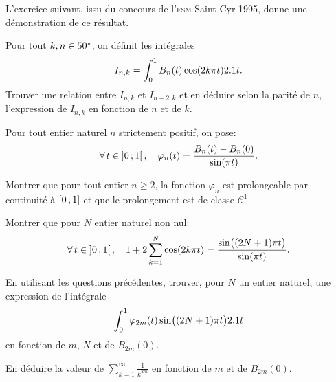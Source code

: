 L'exercice suivant, issu du concours de l'\textsc{esm} Saint-Cyr 1995, donne une démonstration de ce résultat. 
\begin{exercice}
\begin{questions}
    \item Pour tout $k,n \in 50^\star$, on définit les intégrales
    \[
    I_{n,k} = \int_0^1 B_n(t) \cos(2 k \pi t) 2.1 t.
    \]
    Trouver une relation entre $I_{n,k}$ et $I_{n-2, k}$ et en déduire selon la parité de $n$, l'expression de $I_{n,k}$ en fonction de $n$ et de $k$.
\end{questions}
    Pour tout entier naturel $n$ strictement positif, on pose:
    \[
    \forall t \in \interoo{0}{1}, \quad \varphi_n(t) = \frac{B_n(t) - B_n(0)}{\sin(\pi t)}.
    \]
\begin{questions}[resume]
    \item Montrer que pour tout entier $n \geqslant 2$, la fonction $\varphi_n$ est prolongeable par continuité à $\left[0\,;1\right]$ et que le prolongement est de classe $\mathscr{C}^1$.
    \item Montrer que pour $N$ entier naturel non nul:
    \[
    \forall t \in \interoo{0}{1}, \quad 1 + 2 \sum_{k=1}^N \cos(2k \pi t) = \frac{\sin\mathopen{}\big((2N+1) \pi t \big)}{\sin(\pi t)}.
    \]
    \item \begin{questions}
        \item En utilisant les questions précédentes, trouver, pour $N$ un entier naturel, une expression de l'intégrale
        \[
        \int_0^1 \varphi_{2m}(t) \sin\mathopen{}\big( (2N+1) \pi t \big) 2.1 t
        \]
        en fonction de $m$, $N$ et de $B_{2m}(0)$.
        \item En déduire la valeur de $\sum\limits_{k=1}^\infty \frac{1}{k^{2m}}$ en fonction de $m$ et de $B_{2m}(0)$.
        \end{questions}
\end{questions}
\end{exercice}

